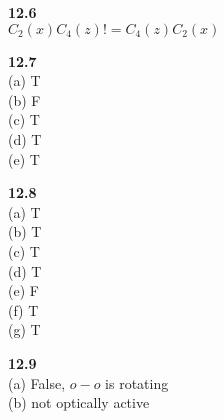 \documentclass{article}
\begin{document}
\textbf{12.6}\\
$C_2(x)C_4(z) != C_4(z)C_2(x)$\\
\newline

\textbf{12.7}\\
(a) T\\
(b) F\\
(c) T\\
(d) T\\
(e) T\\
\newline

\textbf{12.8}\\
(a) T\\
(b) T\\
(c) T\\
(d) T\\
(e) F\\
(f) T\\
(g) T\\
\newline

\textbf{12.9}\\
(a) False, $o-o$ is rotating\\
(b) not optically active\\
\newline
\end{document}
